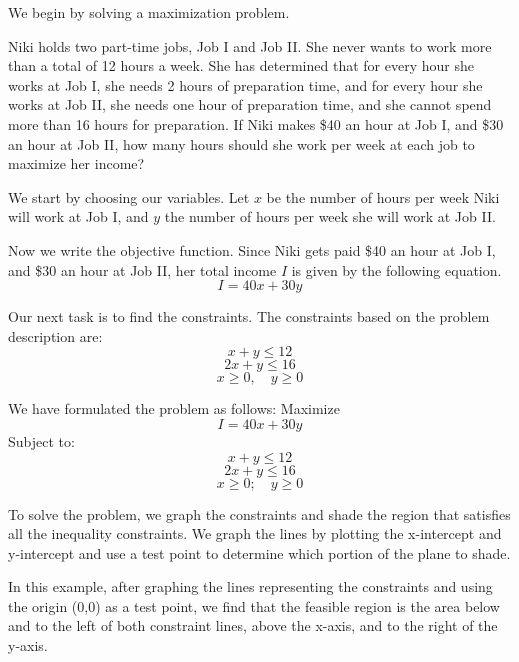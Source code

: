 We begin by solving a maximization problem.

\begin{example}\label{niki_geometry}
    Niki holds two part-time jobs, Job I and Job II. She never wants to work more than a total of 12 hours a week. She has determined that for every hour she works at Job I, she needs 2 hours of preparation time, and for every hour she works at Job II, she needs one hour of preparation time, and she cannot spend more than 16 hours for preparation.
    If Niki makes \$40 an hour at Job I, and \$30 an hour at Job II, how many hours should she work per week at each job to maximize her income?
\end{example}

\begin{solution}
    We start by choosing our variables.
    Let \( x \) be the number of hours per week Niki will work at Job I, and \( y \) the number of hours per week she will work at Job II.

    Now we write the objective function. Since Niki gets paid \$40 an hour at Job I, and \$30 an hour at Job II, her total income \( I \) is given by the following equation.
    \[ I = 40x + 30y \]

    Our next task is to find the constraints. The constraints based on the problem description are:
    \[ x + y \leq 12 \]
    \[ 2x + y \leq 16 \]
    \[ x \geq 0, \quad y \geq 0 \]

    We have formulated the problem as follows:
    Maximize
    \[ I = 40x + 30y \]
    Subject to:
    \[ x + y \leq 12 \]
    \[ 2x + y \leq 16 \]
    \[ x \geq 0; \quad y \geq 0 \]

    To solve the problem, we graph the constraints and shade the region that satisfies all the inequality constraints. We graph the lines by plotting the x-intercept and y-intercept and use a test point to determine which portion of the plane to shade.

    In this example, after graphing the lines representing the constraints and using the origin (0,0) as a test point, we find that the feasible region is the area below and to the left of both constraint lines, above the x-axis, and to the right of the y-axis.
\end{solution}

